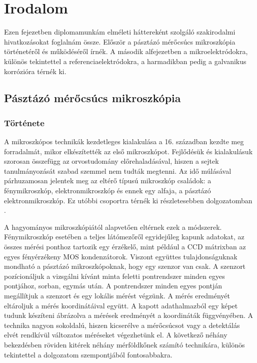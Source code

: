 \chapter{Irodalom}
\pagestyle{headings}

Ezen fejezetben diplomamunkám elméleti háttereként szolgáló szakirodalmi hivatkozásokat foglalnám össze. Először a pásztázó mérőcsúcs mikroszkópia történetéről és működéséről írnék. A második alfejezetben a mikroelektródokra, különös tekintettel a referenciaelektródokra, a harmadikban pedig a galvanikus korrózióra térnék ki.

\section{Pásztázó mérőcsúcs mikroszkópia}

\subsection{Története}

A mikroszkópos technikák kezdetleges kialakulása a 16. században kezdte meg forradalmát, mikor elkészítették az első mikroszkópot. Fejlődésük és kialakulásuk szorosan összefügg az orvostudomány előrehaladásával, hiszen a sejtek tanulmányozását szabad szemmel nem tudták megtenni. Az idő múlásával párhuzamosan jelentek meg az eltérő típusú mikroszkóp családok: a fénymikroszkóp, elektronmikroszkóp és ennek egy alfaja, a pásztázó elektronmikroszkóp. Ez utóbbi csoportra térnék ki részletesebben dolgozatomban \cite{masters2008history}. 

A hagyományos mikroszkópiától alapvetően eltérnek ezek a módszerek. Fénymikroszkóp esetében a teljes látómezőről egyidejűleg kapunk adatokat, az összes mérési ponthoz tartozik egy érzékelő, mint például a CCD mátrixban az egyes fényérzékeny MOS kondenzátorok. Viszont együttes tulajdonságuknak mondható a pásztázó mikroszkópoknak, hogy egy szenzor van csak. A szenzort pozícionáljuk a vizsgálni kívánt minta feletti pontrendszer minden egyes pontjához, sorban, egymás után. A pontrendszer minden egyes pontján megállítjuk a szenzort és egy lokális mérést végzünk. A mérés eredményét eltároljuk a mérés koordinátáival együtt. A kapott adathalmazból egy képet tudunk készíteni ábrázolva a mérések eredményét a koordináták függvényében. A technika nagyon sokoldalú, hiszen kicserélve a mérőcsúcsot vagy a detektálás elvét rendkívül változatos méréseket végezhetünk el. A következő néhány bekezdésben röviden kitérek néhány mérföldkőnek számító technikára, különös tekintettel a dolgozatom szempontjából fontosabbakra.
 
